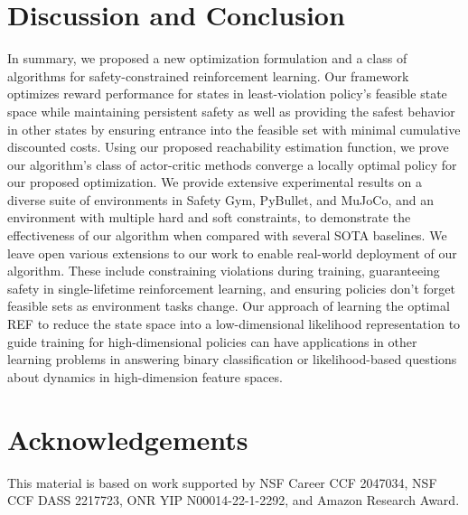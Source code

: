 \documentclass{article}
\theoremstyle{definition}
\begin{document}
\section{Discussion and Conclusion}
In summary, we proposed a new optimization formulation and a class of algorithms for safety-constrained reinforcement learning. Our framework optimizes reward performance for states in least-violation policy's feasible state space while maintaining persistent safety as well as providing the safest behavior in other states by ensuring entrance into the feasible set with minimal cumulative discounted costs. Using our proposed reachability estimation function, we prove our algorithm's class of actor-critic methods converge a locally optimal policy for our proposed optimization. We provide extensive experimental results on a diverse suite of environments in Safety Gym, PyBullet, and MuJoCo, and an environment with multiple hard and soft constraints, to demonstrate the effectiveness of our algorithm when compared with several SOTA baselines. 
We leave open various extensions to our work to enable real-world deployment of our algorithm. These include constraining violations during training, guaranteeing safety in single-lifetime reinforcement learning, and ensuring policies don't forget feasible sets as environment tasks change. Our approach of learning the optimal REF to reduce the state space into a low-dimensional likelihood representation to guide training for high-dimensional policies can have applications in other learning problems in answering binary classification or likelihood-based questions about dynamics in high-dimension feature spaces. 

\section{Acknowledgements}
This material is based on work supported by NSF Career CCF 2047034, NSF CCF DASS 2217723, ONR YIP N00014-22-1-2292, and Amazon Research Award.

\newpage 

\end{document}
